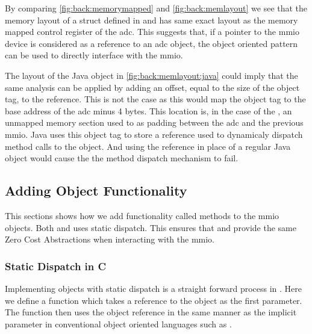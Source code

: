 By comparing \autoref{fig:back:memorymapped} and \autoref{fig:back:memlayout} we see that the memory layout of a struct defined in {\rust} and {\C} has same exact layout as the memory mapped control register of the \gls{adc}.
This suggests that, if a pointer to the \gls{mmio} device is considered as a reference to an \gls{adc} object, the object oriented pattern can be used to directly interface with the \gls{mmio}.

The layout of the Java object in \autoref{fig:back:memlayout:java} could imply that the same analysis can be applied by adding an offset, equal to the size of the object tag, to the reference.
This is not the case as this would map the object tag to the base address of the \gls{adc} minus 4 bytes.
This location is, in the case of the {\gecko}, an unmapped memory section used to as padding between the \gls{adc} and the previous \gls{mmio}.
Java uses this object tag to store a reference used to dynamicaly dispatch method calls to the object.
And using the reference in place of a regular Java object would cause the the method dispatch mechanism to fail.

\subsection{Adding Object Functionality}

This sections shows how we add functionality called methods to the \gls{mmio} objects.
Both {\C} and {\rust} uses static dispatch.
This ensures that {\C} and {\rust} provide the same Zero Cost Abstractions when interacting with the \gls{mmio}.

\subsubsection{Static Dispatch in C}

Implementing objects with static dispatch is a straight forward process in {\C}.
Here we define a function which takes a reference to the object as the first parameter.
The function then uses the object reference in the same manner as the implicit  parameter in conventional object oriented languages such as {\Java}.


